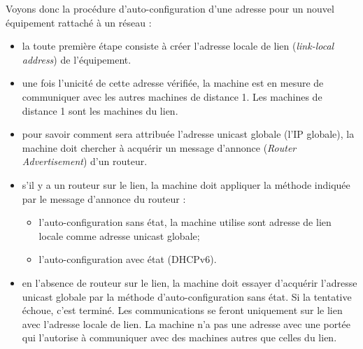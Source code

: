 Voyons donc la procédure d’auto-configuration d’une adresse pour un nouvel équipement rattaché à un réseau :
\begin{itemize}
  \item la toute première étape consiste à créer l'adresse locale de lien (\textit{link-local address}) de l’équipement.
  \item une fois l'unicité de cette adresse vérifiée, la machine est en mesure de communiquer avec les autres machines de distance 1. Les machines de distance 1 sont les machines du lien.
  \item pour savoir comment sera attribuée l’adresse unicast globale (l’IP globale), la machine doit chercher à acquérir un message d'annonce (\textit{Router Advertisement}) d’un routeur.
  \item s'il y a un routeur sur le lien, la machine doit appliquer la méthode indiquée par le message d'annonce du routeur :
    \begin{itemize}
      \item l'auto-configuration sans état, la machine utilise sont adresse de lien locale comme adresse unicast globale;
      \item l'auto-configuration avec état (DHCPv6).
    \end{itemize}
  \item en l'absence de routeur sur le lien, la machine doit essayer d'acquérir l'adresse unicast globale par la méthode d'auto-configuration sans état. Si la tentative échoue, c'est terminé. Les communications se feront uniquement sur le lien avec l'adresse locale de lien. La machine n'a pas une adresse avec une portée qui l'autorise à communiquer avec des machines autres que celles du lien.
\end{itemize}


